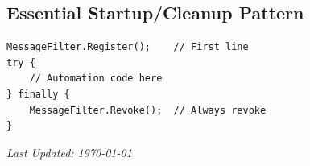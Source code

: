 \documentclass[11pt,a4paper]{article}
\begin{document}
\subsection*{Essential Startup/Cleanup Pattern}

\begin{lstlisting}[style=csharpstyle]
MessageFilter.Register();    // First line
try {
    // Automation code here
} finally {
    MessageFilter.Revoke();  // Always revoke
}
\end{lstlisting}

\vfill

\begin{center}
\textit{Last Updated: \today}
\end{center}
\end{document}
